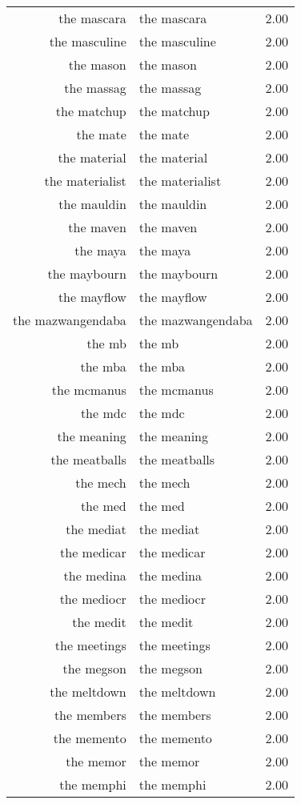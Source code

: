 \begin{table}[ht]
\begin{tabular}{rlr}
  the mascara & the mascara & 2.00 \\ 
  the masculine & the masculine & 2.00 \\ 
  the mason & the mason & 2.00 \\ 
  the massag & the massag & 2.00 \\ 
  the matchup & the matchup & 2.00 \\ 
  the mate & the mate & 2.00 \\ 
  the material & the material & 2.00 \\ 
  the materialist & the materialist & 2.00 \\ 
  the mauldin & the mauldin & 2.00 \\ 
  the maven & the maven & 2.00 \\ 
  the maya & the maya & 2.00 \\ 
  the maybourn & the maybourn & 2.00 \\ 
  the mayflow & the mayflow & 2.00 \\ 
  the mazwangendaba & the mazwangendaba & 2.00 \\ 
  the mb & the mb & 2.00 \\ 
  the mba & the mba & 2.00 \\ 
  the mcmanus & the mcmanus & 2.00 \\ 
  the mdc & the mdc & 2.00 \\ 
  the meaning & the meaning & 2.00 \\ 
  the meatballs & the meatballs & 2.00 \\ 
  the mech & the mech & 2.00 \\ 
  the med & the med & 2.00 \\ 
  the mediat & the mediat & 2.00 \\ 
  the medicar & the medicar & 2.00 \\ 
  the medina & the medina & 2.00 \\ 
  the mediocr & the mediocr & 2.00 \\ 
  the medit & the medit & 2.00 \\ 
  the meetings & the meetings & 2.00 \\ 
  the megson & the megson & 2.00 \\ 
  the meltdown & the meltdown & 2.00 \\ 
  the members & the members & 2.00 \\ 
  the memento & the memento & 2.00 \\ 
  the memor & the memor & 2.00 \\ 
  the memphi & the memphi & 2.00 \\ 

\end{tabular}
\end{table}
